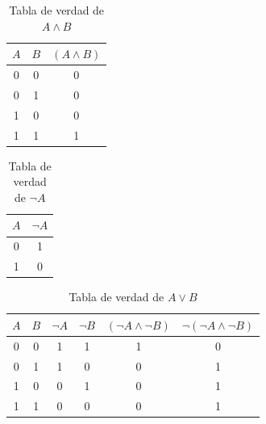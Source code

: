\message{ !name(main.tex)}\documentclass[12pt,a4paper]{book}
\begin{document}
    \begin{table}[htbp]
        \centering
        \caption{Tabla de verdad de $A \land B$}
        \renewcommand{\arraystretch}{1.5}
        \setlength{\tabcolsep}{15pt}
        \begin{tabular}{c | c | c}
            $A$ & $B$ & $(A \land B)$ \\
            \hline
            0 & 0 & 0 \\
            0 & 1 & 0 \\
            1 & 0 & 0 \\
            1 & 1 & 1 \\
        \end{tabular}
    \end{table}

    \vspace{0.5cm}

    \begin{table}[htbp]
        \centering
        \caption{Tabla de verdad de $\neg A$}
        \renewcommand{\arraystretch}{1.5}
        \setlength{\tabcolsep}{15pt}
        \begin{tabular}{c | c}
            $A$ & $\neg A$\\
            \hline
            0 & 1 \\
            1 & 0
        \end{tabular}
    \end{table}

    \vspace{0.5cm}

    \begin{table}[htbp]
        \centering
        \caption{Tabla de verdad de $A\vee B$}
        \renewcommand{\arraystretch}{1.5}
        \setlength{\tabcolsep}{15pt}
        \begin{tabular}{c | c | c | c | c | c}
            $A$ & $B$ & $\neg A$ & $\neg B$ & $(\neg A\wedge\neg B)$ & $\neg(\neg A\wedge\neg B)$ \\
            \hline
            0 & 0 & 1 & 1 & 1 & 0 \\
            0 & 1 & 1 & 0 & 0 & 1 \\
            1 & 0 & 0 & 1 & 0 & 1 \\
            1 & 1 & 0 & 0 & 0 & 1
        \end{tabular}
    \end{table}

    \vspace{0.5cm}
\end{document}
